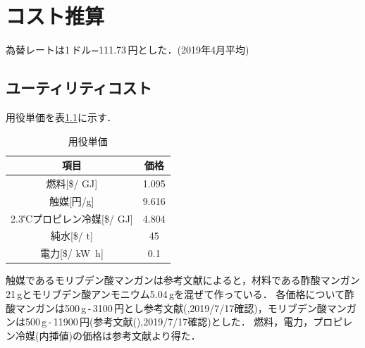 \documentclass[a4j]{jsreport}
\begin{document}
\appendix
\chapter{コスト推算}

為替レートは1\,ドル=111.73\,円とした．(2019年4月平均)
\section{ユーティリティコスト}
用役単価を表\ref{用役単価}に示す．
\begin{table}[htbp]
  \centering
  \caption{用役単価}
  \label{用役単価}
  \begin{tabular}{cc}
    \hline
    項目 & 価格 \\
    \hline
    燃料[\$/ \si{\giga \joule}] & 1.095 \\
    触媒[円/g] & 9.616 \\
    2.3℃プロピレン冷媒[\$/ \si{\giga \joule}] & 4.804 \\
    純水[\$/ \si{\tonne}] & 45 \\
    電力[\$/ \si{\kilo \watt \hour}] & 0.1 \\
    \hline
  \end{tabular}
\end{table}
触媒であるモリブデン酸マンガンは参考文献\cite{Li2019}によると，材料である酢酸マンガン21\,gとモリブデン酸アンモニウム5.04\,gを混ぜて作っている．
各価格について酢酸マンガンは500\,g\,-\,3100\,円とし参考文献(\cite{酢酸マンガン},2019/7/17確認)，モリブデン酸マンガンは500\,g\,-\,11900\,円(参考文献(\cite{モリブデン酸アンモニウム}),2019/7/17確認)とした．
燃料，電力，プロピレン冷媒(内挿値)の価格は参考文献\cite{プロセスデザインコンテスト10}より得た．
\end{document}
